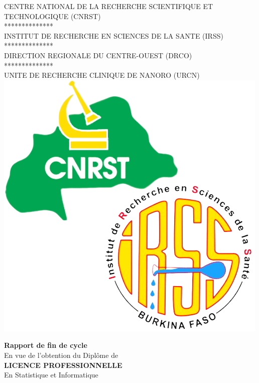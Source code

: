 \documentclass[12pt,a4paper]{report}
\begin{document}
	\hspace{0.1\textwidth}
	\noindent
	\begin{minipage}[t]{0.45\textwidth}
		\fontsize{10pt}{0.4cm}\selectfont
		\begin{center}
			CENTRE NATIONAL DE LA RECHERCHE SCIENTIFIQUE ET TECHNOLOGIQUE (CNRST)\\
			************** \\
			INSTITUT DE RECHERCHE EN SCIENCES DE LA SANTE (IRSS)\\
			************** \\
			DIRECTION REGIONALE DU CENTRE-OUEST (DRCO)\\
			************** \\
			UNITE DE RECHERCHE CLINIQUE DE NANORO (URCN)\\ \vspace{0.4cm}
			\includegraphics[scale=0.25]{urcn1.png}
		\end{center}
		
	\end{minipage}
	
	\vspace{1cm}
	
	\begin{center}
		\textcolor{black!70}{\textbf{\LARGE Rapport de fin de cycle}}\\
		\large En vue de l'obtention du Diplôme de \\
		\textbf{LICENCE PROFESSIONNELLE}\\
		\large En Statistique et Informatique\\
	\end{center}
	
\end{document}
